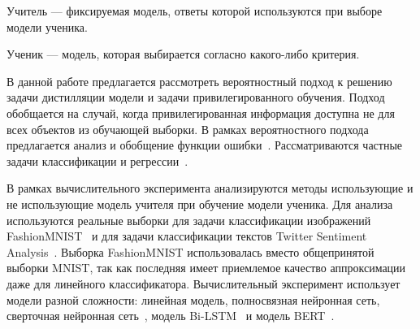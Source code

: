 \begin{definition}
Учитель --- фиксируемая модель, ответы которой используются при выборе модели ученика.
\end{definition}

\begin{definition}
Ученик --- модель, которая выбирается согласно какого-либо критерия.
\end{definition}

В данной работе предлагается рассмотреть вероятностный подход к решению задачи дистилляции модели и задачи привилегированного обучения. Подход обобщается на случай, когда привилегированная информация доступна не для всех объектов из обучающей выборки. В рамках вероятностного подхода предлагается анализ и обобщение функции ошибки~\cite{Hinton2015, Lopez2016}. Рассматриваются частные задачи классификации и регрессии~\cite{Ivakhnenko1994}.


В рамках вычислительного эксперимента анализируются методы использующие и не использующие модель учителя при обучение модели ученика. Для анализа используются реальные выборки для задачи классификации изображений FashionMNIST~\cite{fashionmnist} и для задачи классификации текстов Twitter Sentiment Analysis~\cite{twiter2013}. Выборка FashionMNIST использовалась вместо общепринятой выборки MNIST, так как последняя имеет приемлемое качество аппроксимации даже для линейного классификатора. Вычислительный эксперимент использует модели разной сложности: линейная модель, полносвязная нейронная сеть, сверточная нейронная сеть~\cite{LeCun1989}, модель Bi-LSTM~\cite{Schmidhuber1997} и модель BERT~\cite{Devlin2018}.

